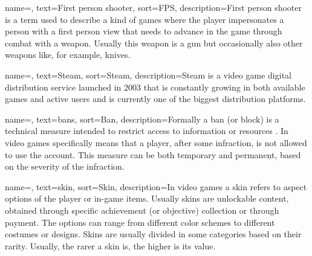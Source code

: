\renewcommand{\acronymname}{Acronyms e abbreviations}

	
\renewcommand{\glossaryname}{Glossary}

{
    name=,
    text=First person shooter,
    sort=FPS,
    description={First person shooter is a term used to describe a kind of games where the player impersonates a person with a first person view that needs to advance in the game through combat with a weapon. Usually this weapon is 
	a gun but occasionally also other weapons like, for example, knives.}
}

{
    name=,
    text=Steam,
    sort=Steam,
    description={Steam is a video game digital distribution service launched in 2003 that is constantly growing in both available games and active users and is currently one of the biggest distribution platforms.}
}

{
    name=,
    text=bans,
    sort=Ban,
    description={Formally a ban (or block) is a technical measure intended to restrict access to information or resources \cite{site:wiki}. In video games specifically means that a player, after some infraction, is not allowed to use the account. 
	This measure can be both temporary and permanent, based on the severity of the infraction.}
}

{
    name=,
    text=skin,
    sort=Skin,
    description={In video games a skin refers to aspect options of the player or in-game items. Usually skins are unlockable content, obtained through specific achievement (or objective) collection or through payment. The options can range from different 
		color schemes to different costumes or designs. Skins are usually divided in some categories based on their rarity. Usually, the rarer a skin is, the higher is its value.}
}

